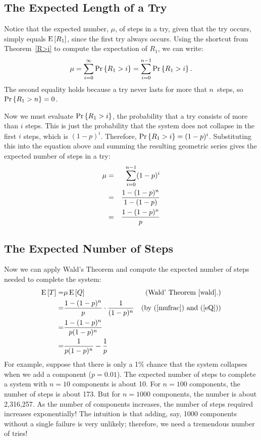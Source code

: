 \documentclass[11pt,twoside]{article}
\begin{document}
\subsection{The Expected Length of a Try}

Notice that the expected number, $\mu$, of steps in a try, given that the
try occurs, simply equals $\mathop{\textup{E}}\nolimits\left[R_1\right]$, since the first try always
occurs.  Using the shortcut from Theorem~\ref{R>i} to compute the
expectation of $R_1$, we can write:
\begin{displaymath}
  \mu = \sum_{i=0}^{\infty} \mathop{\textup{Pr}}\nolimits\left\{R_1 > i\right\} = \sum_{i=0}^{n-1} \mathop{\textup{Pr}}\nolimits\left\{R_1 > i\right\}.
\end{displaymath}
The second equality holds because a try never lasts for more that
$n$~steps, so $\mathop{\textup{Pr}}\nolimits\left\{R_1 > n\right\} = 0$.

Now we must evaluate $\mathop{\textup{Pr}}\nolimits\left\{R_1 > i\right\}$, the probability that a try
consists of more than $i$ steps.  This is just the probability that
the system does not collapse in the first $i$ steps, which is
$(1-p)^i$.  Therefore, $\mathop{\textup{Pr}}\nolimits\left\{R_1 > i\right\} = (1-p)^i$.  Substituting this
into the equation above and summing the resulting geometric series
gives the expected number of steps in a try:
\begin{eqnarray}
\mu     & = & \sum_{i=0}^{n-1} (1-p)^i \notag\\
           & = & \frac{1 - (1-p)^n}{1 - (1-p)} \notag\\
           & = & \frac{1 - (1-p)^n}{p} \label{mufrac}
\end{eqnarray}

\subsection{The Expected Number of Steps} 

Now we can apply Wald's Theorem and compute the expected number of steps
needed to complete the system:
\begin{align*}
\mathop{\textup{E}}\nolimits\left[T\right]  = & \mu \mathop{\textup{E}}\nolimits\left[Q\right]  & \text{(Wald' Theorem~\ref{wald}.)}\\
            = & \frac{1 - (1-p)^n}{p}  \cdot \frac{1}{(1-p)^n} &
                   \text{(by~(\ref{mufrac}) and~(\ref{eQ}))}\\
            = & \frac{1 - (1-p)^n}{p (1-p)^n} \\
            = & \frac{1}{p (1-p)^n} - \frac{1}{p}\\
\end{align*}
For example, suppose that there is only a 1\% chance that the system
collapses when we add a component ($p = 0.01$).  The expected number
of steps to complete a system with $n = 10$ components is about
10.  For $n = 100$ components, the number of steps is about 173.
But for $n=1000$ components, the number is about 2,316,257.  As the
number of components increases, the number of steps required increases
exponentially!  The intuition is that adding, say, 1000 components
without a single failure is very unlikely; therefore, we need a
tremendous number of tries!
\end{document}
